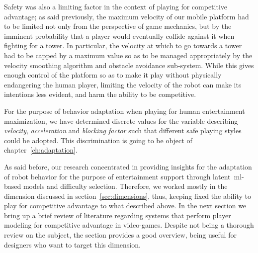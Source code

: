 Safety was also a limiting factor in the context of playing for competitive advantage; as said previously, the maximum velocity of our mobile platform had to be limited not only from the perspective of game mechanics, but by the imminent probability that a player would eventually collide against it when fighting for a tower. In particular, the velocity at which to go towards a tower had to be capped by a maximum value so as to be managed appropriately by the velocity smoothing algorithm and obstacle avoidance sub-system. While this gives enough control of the platform so as to make it play without physically endangering the human player, limiting the velocity of the robot can make its intentions less evident, and harm the ability to be competitive.

For the purpose of behavior adaptation when playing for human entertainment maximization, we have determined discrete values for the variable describing \textit{velocity}, \textit{acceleration} and \textit{blocking factor} such that different safe playing styles could be adopted. This discrimination is going to be object of chapter~\ref{ch:adaptation}.

As said before, our research concentrated in providing insights for the adaptation of robot behavior for the purpose of entertainment support through latent~\gls{ml}-based models and difficulty selection. Therefore, we worked mostly in the dimension discussed in section~\ref{sec:dimensions}, thus, keeping fixed the ability to play for competitive advantage to what described above. In the next section we bring up a brief review of literature regarding systems that perform player modeling for competitive advantage in video-games. Despite not being a thorough review on the subject, the section provides a good overview, being useful for designers who want to target this dimension.


